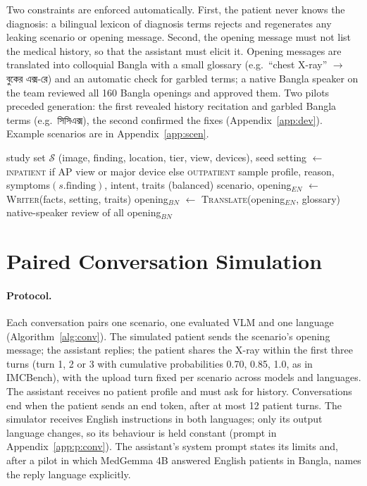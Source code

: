 \documentclass[11pt]{article}
\newcommand{\bn}[1]{{\bnfont #1}}
\begin{document}
Two constraints are enforced automatically. First, the patient never knows the diagnosis: a bilingual lexicon of diagnosis terms rejects and regenerates any leaking scenario or opening message. Second, the opening message must not list the medical history, so that the assistant must elicit it. Opening messages are translated into colloquial Bangla with a small glossary (e.g.\ ``chest X-ray'' $\rightarrow$ \bn{বুকের এক্স}-\bn{রে}) and an automatic check for garbled terms; a native Bangla speaker on the team reviewed all 160 Bangla openings and approved them. Two pilots preceded generation: the first revealed history recitation and garbled Bangla terms (e.g.\ \bn{সিসিএক্স}), the second confirmed the fixes (Appendix~\ref{app:dev}). Example scenarios are in Appendix~\ref{app:scen}.

\begin{algorithm}[t]
\caption{Scenario construction}\label{alg:scen}
\small
\begin{algorithmic}[1]
\Require study set $\mathcal{S}$ (image, finding, location, tier, view, devices), seed
  \State setting $\gets$ \textsc{inpatient} if AP view or major device else \textsc{outpatient}
  \State sample profile, reason, symptoms$(s.\text{finding})$, intent, traits (balanced)
  \Repeat
    \State scenario, opening$_{EN}$ $\gets$ \textsc{Writer}(facts, setting, traits)
  \Repeat
    \State opening$_{BN}$ $\gets$ \textsc{Translate}(opening$_{EN}$, glossary)
\EndFor
\State native-speaker review of all opening$_{BN}$
\end{algorithmic}
\end{algorithm}

\section{Paired Conversation Simulation}\label{sec:sim}
\paragraph{Protocol.} Each conversation pairs one scenario, one evaluated VLM and one language (Algorithm~\ref{alg:conv}). The simulated patient sends the scenario's opening message; the assistant replies; the patient shares the X-ray within the first three turns (turn 1, 2 or 3 with cumulative probabilities 0.70, 0.85, 1.0, as in IMCBench), with the upload turn fixed per scenario across models and languages. The assistant receives no patient profile and must ask for history. Conversations end when the patient sends an end token, after at most 12 patient turns. The simulator receives English instructions in both languages; only its output language changes, so its behaviour is held constant (prompt in Appendix~\ref{app:p:conv}). The assistant's system prompt states its limits and, after a pilot in which MedGemma 4B answered English patients in Bangla, names the reply language explicitly.
\end{document}
